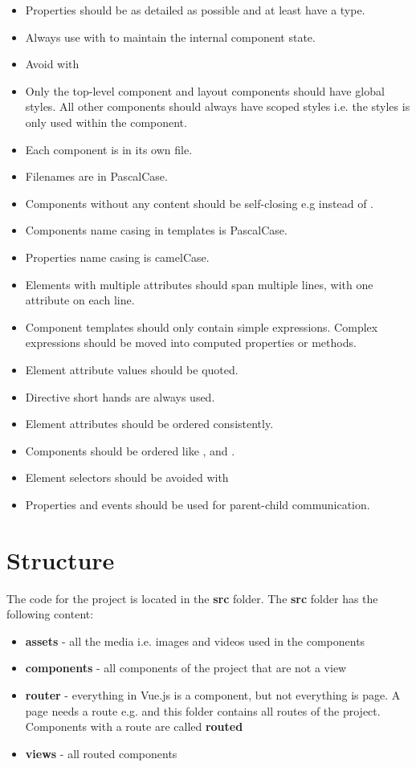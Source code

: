 \begin{itemize}
    \item Properties should be as detailed as possible and at least have a type.
    \item Always use  with  to maintain the internal component state.
    \item Avoid  with 
    \item Only the top-level  component and layout components should have global styles. All other components should always have scoped styles i.e. the styles is only used within the component.
    \item Each component is in its own file.
    \item Filenames are in PascalCase.
    \item Components without any content should be self-closing e.g  instead of .
    \item Components name casing in templates is PascalCase.
    \item Properties name casing is camelCase.
    \item Elements with multiple attributes should span multiple lines, with one attribute on each line.
    \item Component templates should only contain simple expressions. Complex expressions should be moved into computed properties or methods.
    \item Element attribute values should be quoted.
    \item Directive short hands are always used.
    \item Element attributes should be ordered consistently.
    \item Components should be ordered like ,  and .
    \item Element selectors should be avoided with 
    \item Properties and events should be used for parent-child communication.
\end{itemize}

\section{Structure}
\label{section:structure}
The code for the project is located in the \textbf{src} folder. The \textbf{src} folder has the following content: 

\begin{itemize}
    \item \textbf{assets} - all the media i.e. images and videos used in the components
    \item \textbf{components} - all components of the project that are not a view
    \item \textbf{router} - everything in Vue.js is a component, but not everything is page. A page needs a route e.g.  and this folder contains all routes of the project. Components with a route are called \textbf{routed}
    \item \textbf{views} - all routed components
\end{itemize}

